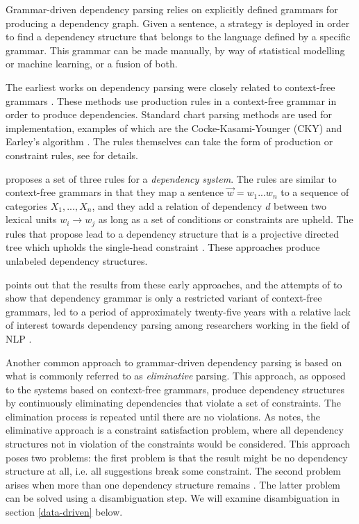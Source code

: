 Grammar-driven dependency parsing relies on explicitly defined grammars for producing a dependency graph. Given a sentence, a strategy is deployed in order to find a dependency structure that belongs to the language defined by a specific grammar. This grammar can be made manually, by way of statistical modelling or machine learning, or a fusion of both.


The earliest works on dependency parsing were closely related to context-free grammars \cite{KublerEtAl:09}. These methods use production rules in a context-free grammar in order to produce dependencies. Standard chart parsing methods are used for implementation, examples of which are the Cocke-Kasami-Younger (CKY) \cite{Younger:67} and Earley's algorithm \cite{Early:70}. The rules themselves can take the form of production or constraint rules, see  for details.

\citeauthor{Gaifman:65} proposes a set of three rules for a \textit{dependency system}. The rules are similar to context-free grammars in that they map a sentence $\vec{w} = w_1 ... w_n$ to a sequence of categories $X_1, ..., X_n$, and they add a relation of dependency $d$ between two lexical units $w_i \rightarrow w_j$ as long as a set of conditions or constraints are upheld. The rules that \citeauthor{Gaifman:65} propose lead to a dependency structure that is a projective directed tree which upholds the single-head constraint \cite{Gaifman:65}. These approaches produce unlabeled dependency structures.

\citeauthor{Niv:05} points out that the results from these early approaches, and the attempts of \citeauthor{Gaifman:65} to show that dependency grammar is only a restricted variant of context-free grammars, led to a period of approximately twenty-five years with a relative lack of interest towards dependency parsing among researchers working in the field of NLP \cite{Niv:05}.

Another common approach to grammar-driven dependency parsing is based on what is commonly referred to as \textit{eliminative} parsing. This approach, as opposed to the systems based on context-free grammars, produce dependency structures by continuously eliminating dependencies that violate a set of constraints. The elimination process is repeated until there are no violations. As \citeauthor{Niv:05} notes, the eliminative approach is a constraint satisfaction problem, where all dependency structures not in violation of the constraints would be considered. This approach poses two problems: the first problem is that the result might be no dependency structure at all, i.e. all suggestions break some constraint. The second problem arises when more than one dependency structure remains \cite{Niv:05}. The latter problem can be solved using a disambiguation step. We will examine disambiguation in section \ref{data-driven} below.

